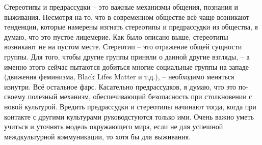 \documentclass[14pt, a4paper] {ncc}
\begin{document}
Стереотипы и предрассудки -- это важные механизмы общения, познания и выживания.
Несмотря на то, что в современном обществе всё чаще возникают тенденции, которые
намерены изгнать стереотипы и предрассудки из общества, я думаю, что это пустое
лицемерие. Как было описано выше, стереотипы возникают не на пустом месте.
Стереотип -- это отражение общей сущности группы. Для того, чтобы другие группы
приняли о данной другие взгляды, -- а именно этого сейчас пытаются добиться
многие социальные группы на западе (движения феминизма, Black Lifes Matter и т.д.), --
необходимо меняться изнутри. Всё остальное фарс. Касательно предрассудков, я думаю,
что это по-своему полезный механизм, обеспечивающий безопасность при столкновении
с новой культурой. Вредить предрассудки и стереотипы начинают тогда, когда при контакте с другими
культурами руководстуются только ими. Очень важно уметь учиться и уточнять модель
окружающего мира, если не для успешной междкультурной коммуникации, то хотя бы
для выживания.



\end{document}
